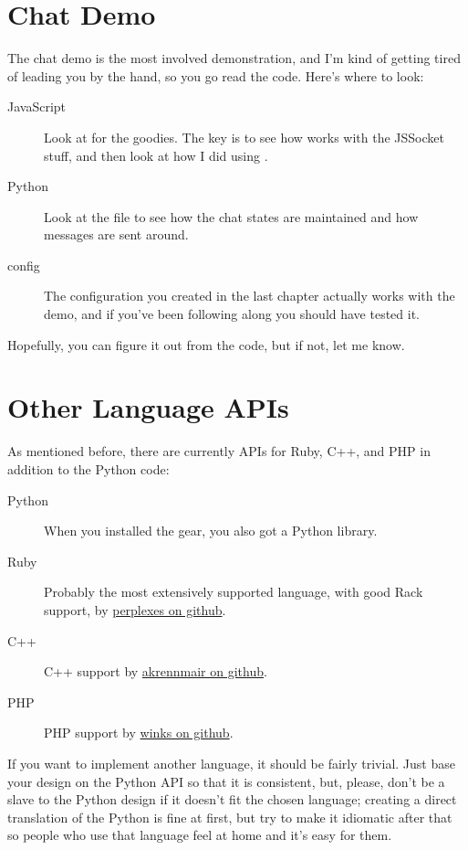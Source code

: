 \section{Chat Demo}

The chat demo is the most involved demonstration, and I'm kind of getting
tired of leading you by the hand, so you go read the code.  Here's where
to look:

\begin{description}
\item [JavaScript] Look at  for the goodies.
    The key is to see how  works with the JSSocket stuff,
    and then look at how I did  using .
\item [Python] Look at the  file to see how
    the chat states are maintained and how messages are sent around.
\item [config] The configuration you created in the last chapter
    actually works with the demo, and if you've been following along
    you should have tested it.
\end{description}

Hopefully, you can figure it out from the code, but if not, let me know.


\section{Other Language APIs}

As mentioned before, there are currently APIs for Ruby, C++, and PHP in
addition to the Python code:


\begin{description}
\item [Python] When you installed the  gear, you also got a  Python library.
\item [Ruby] Probably the most extensively supported language, with good Rack support, by \href{http://github.com/perplexes/m2r}{perplexes on github}.
\item [C++] C++ support by \href{http://github.com/akrennmair/mongrel2-cpp}{akrennmair on github}.
\item [PHP] PHP support by \href{http://github.com/winks/m2php}{winks on github}.
\end{description}


If you want to implement another language, it should be fairly trivial.
Just base your design on the Python API so that it is consistent, but, please,
don't be a slave to the Python design if it doesn't fit the chosen language;
creating a direct translation of the Python is fine at first, but try
to make it idiomatic after that so people who use that language feel at
home and it's easy for them.


